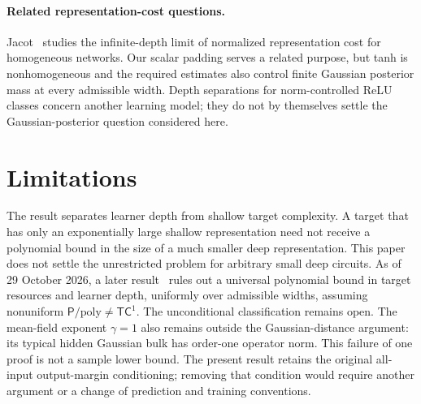 \documentclass[11pt]{article}
\begin{document}
\paragraph{Related representation-cost questions.}
Jacot~\cite{jacot2023} studies the infinite-depth limit of normalized
representation cost for homogeneous networks. Our scalar padding serves
a related purpose, but tanh is nonhomogeneous and the required estimates
also control finite Gaussian posterior mass at every admissible width.
Depth separations for norm-controlled ReLU classes
\cite{parkinson2024} concern another learning model; they do not by
themselves settle the Gaussian-posterior question considered here.








\section{Limitations}

The result separates learner depth from shallow target complexity. A target
that has only an exponentially large shallow representation need not receive
a polynomial bound in the size of a much smaller deep representation.
This paper does not settle the unrestricted problem for arbitrary small
deep circuits. As of 29 October 2026, a later result~\cite{conditional2026}
rules out a universal polynomial bound in target resources and learner
depth, uniformly over admissible widths, assuming nonuniform
$\mathsf P/\mathrm{poly}\ne\mathsf{TC}^1$.
The unconditional classification remains open.
The mean-field exponent $\gamma=1$ also remains outside the Gaussian-distance
argument: its typical hidden Gaussian bulk has order-one operator norm.
This failure of one proof is not a sample lower bound. The present result
retains the original all-input output-margin conditioning; removing that
condition would require another argument or a change of prediction and
training conventions.
\end{document}
